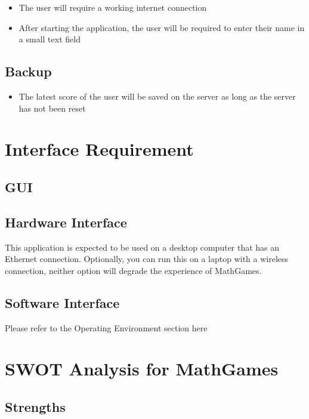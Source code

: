 \documentclass[12pt]{article}
\begin{document}
\begin{itemize}
\item The user will require a working internet connection
\item After starting the application, the user will be required to enter their name in a small text field
\end{itemize}

\subsection{Backup}

\begin{itemize}
\item The latest score of the user will be saved on the server as long as the server has not been reset
\end{itemize}

\section{Interface Requirement}

\subsection{GUI}

\subsection{Hardware Interface}

This application is expected to be used on a desktop computer that has an Ethernet connection.
Optionally, you can run this on a laptop with a wireless connection, neither option will degrade the experience of MathGames.

\subsection{Software Interface}

Please refer to the Operating Environment section here \underline{}

\newpage

\section{SWOT Analysis for MathGames}

\subsection{Strengths}
\end{document}
